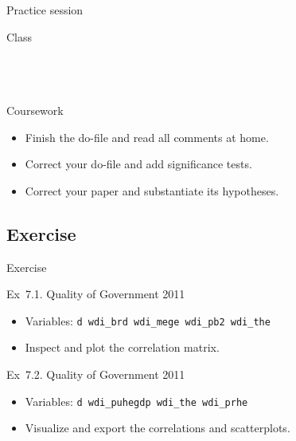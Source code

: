 \documentclass[t]{beamer}
\begin{document}
	\begin{frame}[t]{Practice session}

    \begin{block}{Class}
      \\
      \\
      
			\\
			\\    
    \end{block}

    \begin{alertblock}{Coursework}
      \begin{itemize}
	      \item Finish the do-file and read all comments at home.
	      \item Correct your do-file and add significance tests.
	      \item Correct your paper and substantiate its hypotheses.
      \end{itemize}
    \end{alertblock}
    		
	\end{frame}
	
  \subsection{Exercise}
  
  \begin{frame}{Exercise}

		\begin{exampleblock}{Ex~7.1. Quality of Government 2011}

			\begin{itemize}
				\item Variables: \texttt{d wdi\_brd wdi\_mege wdi\_pb2 wdi\_the}
				\item Inspect and plot the correlation matrix.
			\end{itemize}

		\end{exampleblock}


    \begin{exampleblock}{Ex~7.2. Quality of Government 2011}
			
			\begin{itemize}
				\item Variables: \texttt{d wdi\_puhegdp wdi\_the wdi\_prhe}
				\item Visualize and export the correlations and scatterplots.
			\end{itemize}
			
    \end{exampleblock}


  \end{frame}
	
\end{document}
